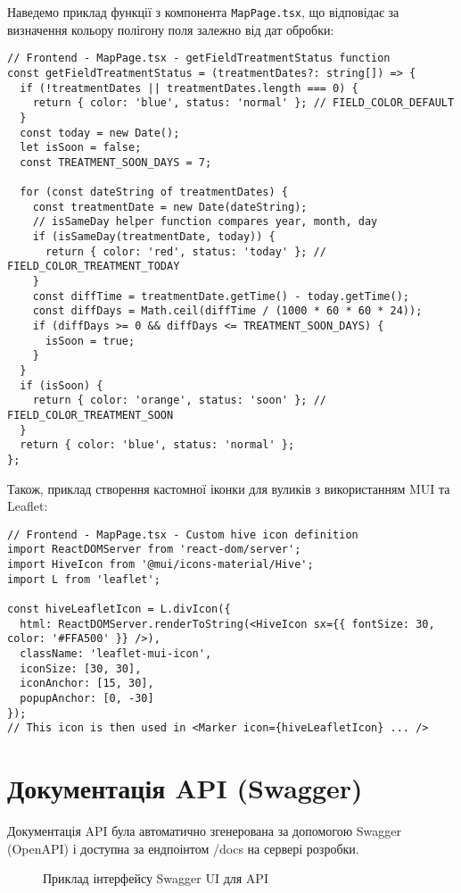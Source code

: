 Наведемо приклад функції з компонента \texttt{MapPage.tsx}, що відповідає за визначення кольору полігону поля залежно від дат обробки:
\begin{verbatim}
// Frontend - MapPage.tsx - getFieldTreatmentStatus function
const getFieldTreatmentStatus = (treatmentDates?: string[]) => {
  if (!treatmentDates || treatmentDates.length === 0) {
    return { color: 'blue', status: 'normal' }; // FIELD_COLOR_DEFAULT
  }
  const today = new Date();
  let isSoon = false;
  const TREATMENT_SOON_DAYS = 7;

  for (const dateString of treatmentDates) {
    const treatmentDate = new Date(dateString);
    // isSameDay helper function compares year, month, day
    if (isSameDay(treatmentDate, today)) {
      return { color: 'red', status: 'today' }; // FIELD_COLOR_TREATMENT_TODAY
    }
    const diffTime = treatmentDate.getTime() - today.getTime();
    const diffDays = Math.ceil(diffTime / (1000 * 60 * 60 * 24));
    if (diffDays >= 0 && diffDays <= TREATMENT_SOON_DAYS) {
      isSoon = true;
    }
  }
  if (isSoon) {
    return { color: 'orange', status: 'soon' }; // FIELD_COLOR_TREATMENT_SOON
  }
  return { color: 'blue', status: 'normal' };
};
\end{verbatim}

Також, приклад створення кастомної іконки для вуликів з використанням MUI та Leaflet:
\begin{verbatim}
// Frontend - MapPage.tsx - Custom hive icon definition
import ReactDOMServer from 'react-dom/server';
import HiveIcon from '@mui/icons-material/Hive';
import L from 'leaflet';

const hiveLeafletIcon = L.divIcon({
  html: ReactDOMServer.renderToString(<HiveIcon sx={{ fontSize: 30, color: '#FFA500' }} />),
  className: 'leaflet-mui-icon',
  iconSize: [30, 30],
  iconAnchor: [15, 30],
  popupAnchor: [0, -30]
});
// This icon is then used in <Marker icon={hiveLeafletIcon} ... />
\end{verbatim}

\chapter{Документація API (Swagger)}
\label{app:swagger_docs}
Документація API була автоматично згенерована за допомогою Swagger (OpenAPI) і доступна за ендпоінтом /docs на сервері розробки.
\begin{figure}[H]
  \centering
  \caption{Приклад інтерфейсу Swagger UI для API}
  \label{fig:swagger}
\end{figure}

